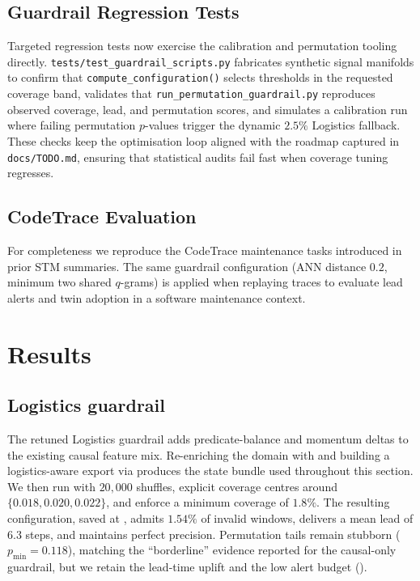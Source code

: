 \documentclass[11pt]{article}
\begin{document}
\subsection{Guardrail Regression Tests}
Targeted regression tests now exercise the calibration and permutation tooling
directly. \texttt{tests/test\_guardrail\_scripts.py} fabricates synthetic signal
manifolds to confirm that \texttt{compute\_configuration()} selects thresholds in
the requested coverage band, validates that
\texttt{run\_permutation\_guardrail.py} reproduces observed coverage, lead, and
permutation scores, and simulates a calibration run where failing
permutation $p$-values trigger the dynamic $2.5\%$ Logistics fallback. These
checks keep the optimisation loop aligned with the roadmap captured in
\texttt{docs/TODO.md}, ensuring that statistical audits fail fast when coverage
tuning regresses.

\subsection{CodeTrace Evaluation}
For completeness we reproduce the CodeTrace maintenance tasks introduced in
prior STM summaries. The same guardrail configuration (ANN distance $0.2$,
minimum two shared $q$-grams) is applied when replaying traces to evaluate lead
alerts and twin adoption in a software maintenance context.

\section{Results}
\subsection{Logistics guardrail}
\label{subsec:permutation}
The retuned Logistics guardrail adds predicate-balance and momentum deltas to the
existing causal feature mix. Re-enriching the domain with
and building a logistics-aware export via
produces the state bundle used throughout this section. We then run
 with $20{,}000$ shuffles, explicit coverage
centres around $\{0.018, 0.020, 0.022\}$, and enforce a minimum coverage of $1.8\%$.
The resulting configuration, saved at
, admits
$1.54\%$ of invalid windows, delivers a mean lead of $6.3$ steps, and maintains
perfect precision. Permutation tails remain stubborn ($p_{\min}=0.118$), matching the
``borderline'' evidence reported for the causal-only guardrail, but we retain the
lead-time uplift and the low alert budget ().
\end{document}
